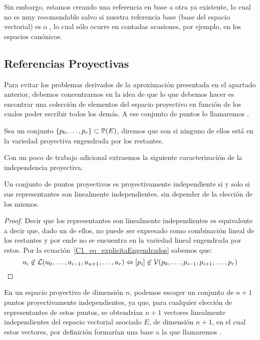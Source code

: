 Sin embargo, estamos creando una referencia en base a otra ya existente, lo cual no es muy recomendable salvo si nuestra referencia base (base del espacio vectorial) es  o , lo cual sólo ocurre en contadas ocasiones, por ejemplo, en los espacios canónicos.
\subsection{Referencias Proyectivas}
Para evitar los problemas derivados de la aproximación presentada en el apartado anterior, debemos concentrarnos en la idea de que lo que debemos hacer es encontrar una colección de elementos del espacio proyectivo en función de los cuales poder escribir todos los demás. A ese conjunto de puntos lo llamaremos .
\begin{defi}
	\label{C1_def_independenciaProyectiva}
	Sea un conjunto $\{p_0,\dots,p_r\}\subset\mathbb{P}(E)$, diremos que son  si ninguno de ellos está en la variedad proyectiva engendrada por los restantes.
\end{defi}
Con un poco de trabajo adicional extraemos la siguiente caracterización de la independencia proyectiva.
\begin{lem}
	\label{C1_lem_caracterizacionIndependencia}
	Un conjunto de puntos proyectivos es proyectivamente independiente si y solo si sus representantes son linealmente independientes, sin depender de la elección de los mismos. 
\end{lem}
\begin{proof}
	Decir que los representantes son linealmente independientes es equivalente a decir que, dado un de ellos, no puede ser expresado como combinación lineal de los restantes y por ende no se encuentra en la variedad lineal engendrada por estos. Por la ecuación~\eqref{C1_eq_explicitaEngendrados} sabemos que:
	\[u_i\not\in\mathcal{L}(u_0,\dots,u_{i-1},u_{u+1},\dots,u_{r})\Leftrightarrow\left [ p_i \right ]\not\in\mathcal{V}(p_0,\dots,p_{i-1},p_{i+1},\dots,p_r)\]
\end{proof}
\begin{obs}
	\label{C1_obs_baseInducida}
	En un espacio proyectivo de dimensión $n$, podemos escoger un conjunto de $n+1$ puntos proyectivamente independientes, ya que, para cualquier elección de representantes de estos puntos, se obtendrían $n+1$ vectores linealmente independientes del espacio vectorial asociado $E$, de dimensión $n+1$, en el cual estos vectores, por definición formarían una base a la que llamaremos .
\end{obs}
